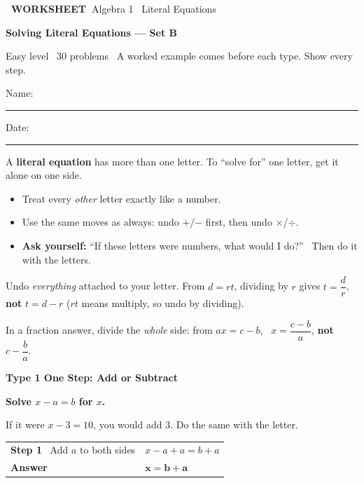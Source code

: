 \documentclass[11pt,letterpaper]{article}
\newcommand{\badge}[1]{\colorbox{fmtitle}{\color{white}\bfseries\small\ #1\ }}
\newcommand{\topicbar}[1]{\needspace{4.5cm}\par\vspace{5mm}
  \begin{tcolorbox}[enhanced,colback=fmtitle,colframe=fmtitle,arc=2mm,left=4mm,top=1.5mm,bottom=1.5mm]
  \color{white}\bfseries\large #1
  \end{tcolorbox}}
\begin{document}
\badge{WORKSHEET}\hfill{\small\color{fmgray}Algebra 1 \textperiodcentered\ Literal Equations}\par\vspace{4mm}
{\color{fmtitle}\LARGE\bfseries Solving Literal Equations --- Set B}\par\vspace{1mm}
{\color{fmgray}Easy level \textperiodcentered\ 30 problems \textperiodcentered\ A worked example comes before each type. Show every step.}\par\vspace{3mm}
Name: \rule{6cm}{0.4pt}\hspace{1cm}Date: \rule{3.5cm}{0.4pt}\par\vspace{1mm}
\begin{keyidea}A \textbf{literal equation} has more than one letter. To ``solve for'' one letter, get it alone on one side.
\begin{itemize}[itemsep=1pt,topsep=2pt]
\item Treat every \emph{other} letter exactly like a number.
\item Use the same moves as always: undo $+$/$-$ first, then undo $\times$/$\div$.
\item \textbf{Ask yourself:} ``If these letters were numbers, what would I do?'' \ Then do it with the letters.
\end{itemize}\end{keyidea}
\begin{mistakebox}Undo \emph{everything} attached to your letter. From $d = rt$, dividing by $r$ gives $t = \dfrac{d}{r}$, \textbf{not} $t = d - r$ ($rt$ means multiply, so undo by dividing).\par
In a fraction answer, divide the \emph{whole} side: from $ax = c - b$, \ $x = \dfrac{c - b}{a}$, \textbf{not} $c - \dfrac{b}{a}$.\end{mistakebox}
\needspace{9cm}\topicbar{Type 1 \quad One Step: Add or Subtract}
\begin{watchme}\textbf{Solve $x - a = b$ for $x$.}\par\vspace{1mm}
If it were $x - 3 = 10$, you would add 3. Do the same with the letter.\par\vspace{1mm}
\renewcommand{\arraystretch}{2.1}\begin{tabular}{@{}l l@{}}
\textbf{Step 1} \ Add $a$ to both sides & $x - a + a = b + a$\\
\textbf{Answer} & $\boldsymbol{x = b + a}$
\end{tabular}\end{watchme}
\end{document}
